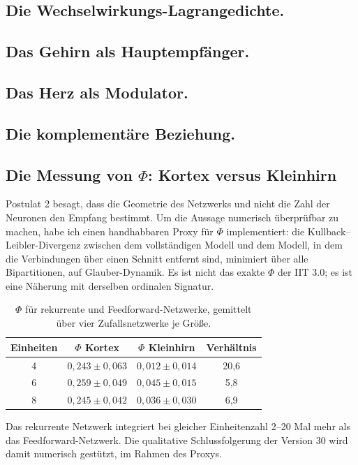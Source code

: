 \subsection{Die Wechselwirkungs-Lagrangedichte.}
\subsection{Das Gehirn als Hauptempfänger.}
\subsection{Das Herz als Modulator.}
\subsection{Die komplementäre Beziehung.}

\subsection{Die Messung von \texorpdfstring{$\Phi$}{Phi}: Kortex versus Kleinhirn}
Postulat 2 besagt, dass die Geometrie des Netzwerks und nicht die Zahl der Neuronen den Empfang bestimmt. Um die Aussage numerisch überprüfbar zu machen, habe ich einen handhabbaren Proxy für $\Phi$ implementiert: die Kullback--Leibler-Divergenz zwischen dem vollständigen Modell und dem Modell, in dem die Verbindungen über einen Schnitt entfernt sind, minimiert über alle Bipartitionen, auf Glauber-Dynamik. Es ist nicht das exakte $\Phi$ der IIT 3.0; es ist eine Näherung mit derselben ordinalen Signatur.

\begin{table}[H]
\centering
\begin{tabular}{@{}cccc@{}}
\toprule
Einheiten & $\Phi$ Kortex & $\Phi$ Kleinhirn & Verhältnis \\ \midrule
4 & $0,243 \pm 0,063$ & $0,012 \pm 0,014$ & 20,6 \\
6 & $0,259 \pm 0,049$ & $0,045 \pm 0,015$ & 5,8 \\
8 & $0,245 \pm 0,042$ & $0,036 \pm 0,030$ & 6,9 \\ \bottomrule
\end{tabular}
\caption{$\Phi$ für rekurrente und Feedforward-Netzwerke, gemittelt über vier Zufallsnetzwerke je Größe.}
\label{tab:phi}
\end{table}

Das rekurrente Netzwerk integriert bei gleicher Einheitenzahl 2--20 Mal mehr als das Feedforward-Netzwerk. Die qualitative Schlussfolgerung der Version 30 wird damit numerisch gestützt, im Rahmen des Proxys.

